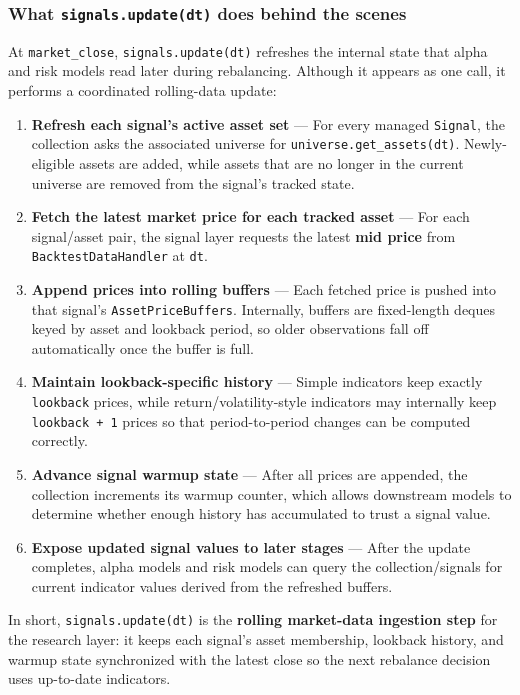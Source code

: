 \documentclass[11pt]{article}
\begin{document}
\subsubsection{What \texttt{signals.update(dt)} does behind the scenes}\label{section:signals.update(dt)}

At \texttt{market\_close}, \texttt{signals.update(dt)} refreshes the internal state that alpha and risk models read later during rebalancing. Although it appears as one call, it performs a coordinated rolling-data update:

\begin{enumerate}[leftmargin=*]
  \item \textbf{Refresh each signal's active asset set} --- For every managed \texttt{Signal}, the collection asks the associated universe for \texttt{universe.get\_assets(dt)}. Newly-eligible assets are added, while assets that are no longer in the current universe are removed from the signal's tracked state.
  \item \textbf{Fetch the latest market price for each tracked asset} --- For each signal/asset pair, the signal layer requests the latest \textbf{mid price} from \texttt{BacktestDataHandler} at \texttt{dt}.
  \item \textbf{Append prices into rolling buffers} --- Each fetched price is pushed into that signal's \texttt{AssetPriceBuffers}. Internally, buffers are fixed-length deques keyed by asset and lookback period, so older observations fall off automatically once the buffer is full.
  \item \textbf{Maintain lookback-specific history} --- Simple indicators keep exactly \texttt{lookback} prices, while return/volatility-style indicators may internally keep \texttt{lookback + 1} prices so that period-to-period changes can be computed correctly.
  \item \textbf{Advance signal warmup state} --- After all prices are appended, the collection increments its warmup counter, which allows downstream models to determine whether enough history has accumulated to trust a signal value.
  \item \textbf{Expose updated signal values to later stages} --- After the update completes, alpha models and risk models can query the collection/signals for current indicator values derived from the refreshed buffers.
\end{enumerate}

In short, \texttt{signals.update(dt)} is the \textbf{rolling market-data ingestion step} for the research layer: it keeps each signal's asset membership, lookback history, and warmup state synchronized with the latest close so the next rebalance decision uses up-to-date indicators.
\end{document}
